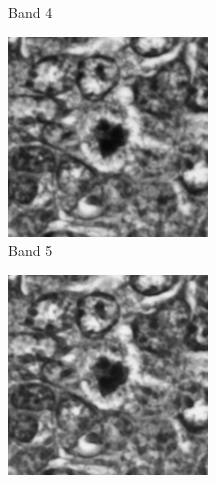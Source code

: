 \documentclass[10pt,twocolumn,letterpaper]{article}
\begin{document}
\begin{figure}[t]
\begin{subfigure}[b]{0.11\textwidth}
		\caption*{Band 4}
	\end{subfigure}
	\begin{subfigure}[b]{0.11\textwidth}
		\centering
		\includegraphics[width=\textwidth]{img/M03_00a_0506_m1.png}
		\caption*{Band 5}
	\end{subfigure}
	\begin{subfigure}[b]{0.11\textwidth}
		\centering
		\includegraphics[width=\textwidth]{img/M03_00a_0606_m1.png}

\end{subfigure}
\end{figure}
\end{document}
